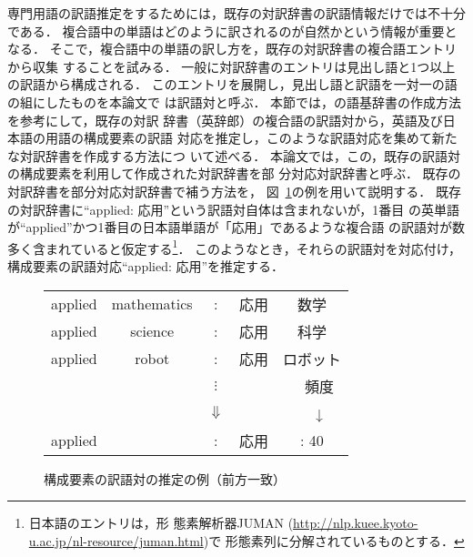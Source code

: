 \documentclass[japanese]{jnlp_1.3a}
\begin{document}
専門用語の訳語推定をするためには，既存の対訳辞書の訳語情報だけでは不十分
である．
複合語中の単語はどのように訳されるのが自然かという情報が重要となる．
そこで，複合語中の単語の訳し方を，既存の対訳辞書の複合語エントリから収集
することを試みる．
一般に対訳辞書のエントリは見出し語と1つ以上の訳語から構成される．
このエントリを展開し，見出し語と訳語を一対一の語の組にしたものを本論文で
は訳語対と呼ぶ．
本節では，\cite{Fujii00}の語基辞書の作成方法を参考にして，既存の対訳
辞書（英辞郎）の複合語の訳語対から，英語及び日本語の用語の構成要素の訳語
対応を推定し，このような訳語対応を集めて新たな対訳辞書を作成する方法につ
いて述べる．
本論文では，この，既存の訳語対の構成要素を利用して作成された対訳辞書を部
分対応対訳辞書と呼ぶ．
既存の対訳辞書を部分対応対訳辞書で補う方法を，
図~\ref{fig:bubunicchi-rei}の例を用いて説明する．
既存の対訳辞書に“applied: 応用”という訳語対自体は含まれないが，1番目
の英単語が``applied''かつ1番目の日本語単語が「応用」であるような複合語
の訳語対が数多く含まれていると仮定する\footnote{日本語のエントリは，形
態素解析器JUMAN (\url{http://nlp.kuee.kyoto-u.ac.jp/nl-resource/juman.html})で
形態素列に分解されているものとする．}．
このようなとき，それらの訳語対を対応付け，構成要素の訳語対応“applied: 応用”を推定する．

\begin{figure}[t]
 \small
 \centering
  \begin{tabular}{ccccc}
   applied & mathematics & : & 応用 & 数学\\
   applied & science & : & 応用 & 科学\\
   applied & robot & : & 応用 & ロボット\\
   & & $\vdots$ & & 　頻度\\
   & & $\Downarrow$ & & 　↓\\
   \hline
   \multicolumn{1}{|c}{applied} & & : & 応用 & \multicolumn{1}{c|}{: 40}\\
   \hline
  \end{tabular}
\vspace{8pt}
 \caption{構成要素の訳語対の推定の例（前方一致）}
 \label{fig:bubunicchi-rei}
\end{figure}
\end{document}

